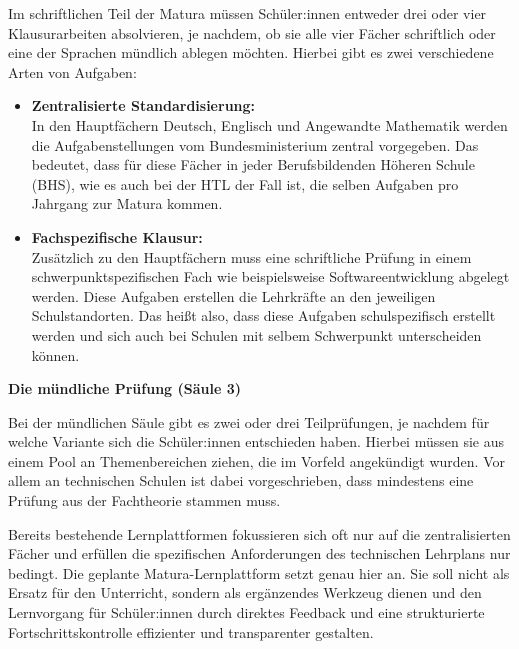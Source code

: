 Im schriftlichen Teil der Matura müssen Schüler:innen entweder drei oder vier Klausurarbeiten absolvieren, je nachdem, ob sie alle vier Fächer schriftlich oder eine der Sprachen mündlich ablegen möchten. Hierbei gibt es zwei verschiedene Arten von Aufgaben:

\begin{itemize}
	\item \textbf{Zentralisierte Standardisierung:} \\
	In den Hauptfächern Deutsch, Englisch und Angewandte Mathematik werden die Aufgabenstellungen vom Bundesministerium zentral vorgegeben. Das bedeutet, dass für diese Fächer in jeder Berufsbildenden Höheren Schule (BHS), wie es auch bei der HTL der Fall ist, die selben Aufgaben pro Jahrgang zur Matura kommen.
	\item \textbf{Fachspezifische Klausur:} \\
	Zusätzlich zu den Hauptfächern muss eine schriftliche Prüfung in einem schwerpunktspezifischen Fach wie beispielsweise Softwareentwicklung abgelegt werden. Diese Aufgaben erstellen die Lehrkräfte an den jeweiligen Schulstandorten.  Das heißt also, dass diese Aufgaben schulspezifisch erstellt werden und sich auch bei Schulen mit selbem Schwerpunkt unterscheiden können.
\end{itemize}


\vspace{0.4cm}
\textbf{Die mündliche Prüfung (Säule 3)}

Bei der mündlichen Säule gibt es zwei oder drei Teilprüfungen, je nachdem für welche Variante sich die Schüler:innen entschieden haben. Hierbei müssen sie aus einem Pool an Themenbereichen ziehen, die im Vorfeld angekündigt wurden. Vor allem an technischen Schulen ist dabei vorgeschrieben, dass mindestens eine Prüfung aus der Fachtheorie stammen muss. 


\vspace{0.4cm}
Bereits bestehende Lernplattformen fokussieren sich oft nur auf die zentralisierten Fächer und erfüllen die spezifischen Anforderungen des technischen Lehrplans nur bedingt. Die geplante Matura-Lernplattform setzt genau hier an. Sie soll nicht als Ersatz für den Unterricht, sondern als ergänzendes Werkzeug dienen und den Lernvorgang für Schüler:innen durch direktes Feedback und eine strukturierte Fortschrittskontrolle effizienter und transparenter gestalten.
